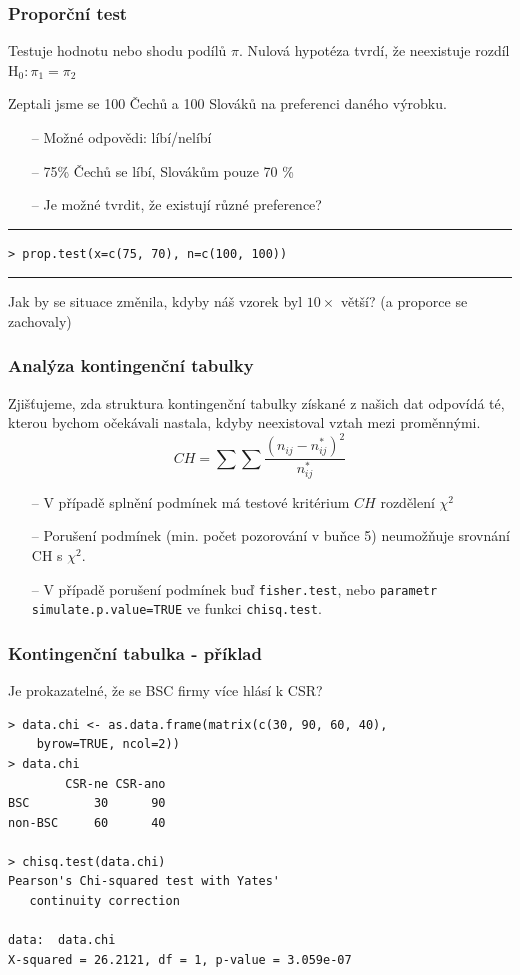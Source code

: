 \documentclass[10pt,xcolor={dvipsnames}]{beamer}
\begin{document}
\begin{frame}[fragile]
\frametitle{Proporční test}
Testuje hodnotu nebo shodu podílů $\pi$. Nulová hypotéza tvrdí, že neexistuje rozdíl $\text{H}_0: \pi_1 = \pi_2$\newline\smallskip

Zeptali jsme se 100 Čechů a 100 Slováků na preferenci daného výrobku.
\begin{itemize}
\item[--] Možné odpovědi: líbí/nelíbí
\item[--] 75\% Čechů se líbí, Slovákům pouze 70 \%
\item[--] Je možné tvrdit, že existují různé preference?
\end{itemize}
\hrule
\begin{verbatim}
> prop.test(x=c(75, 70), n=c(100, 100))
\end{verbatim}
\hrule\smallskip

Jak by se situace změnila, kdyby náš vzorek byl $10\times$ větší? (a proporce se zachovaly)

\end{frame}


\begin{frame}
\frametitle{Analýza kontingenční tabulky}
Zjišťujeme, zda struktura kontingenční tabulky získané z našich dat odpovídá té, kterou bychom očekávali nastala, kdyby neexistoval vztah mezi proměnnými.
\[CH = \sum\sum \frac{\left( n_{ij} - n_{ij}^*\right)^2}{ n_{ij}^*}\]


\begin{itemize}
\item[--] V případě splnění podmínek má testové kritérium $CH$ rozdělení $\chi^2$ 
\item[--] Porušení podmínek (min. počet pozorování v buňce 5) neumožňuje srovnání CH s $\chi^2$.
\item[--] V případě porušení podmínek buď \texttt{fisher.test}, nebo \texttt{parametr simulate.p.value=TRUE} ve funkci \texttt{chisq.test}.
\end{itemize}
\end{frame}


\begin{frame}[fragile]
\frametitle{Kontingenční tabulka - příklad}
Je prokazatelné, že se BSC firmy více hlásí k CSR?
\begin{verbatim}
> data.chi <- as.data.frame(matrix(c(30, 90, 60, 40),
	byrow=TRUE, ncol=2))
> data.chi 
        CSR-ne CSR-ano
BSC         30      90
non-BSC     60      40

> chisq.test(data.chi)
Pearson's Chi-squared test with Yates'
   continuity correction

data:  data.chi
X-squared = 26.2121, df = 1, p-value = 3.059e-07

\end{verbatim}
\end{frame}
\end{document}

